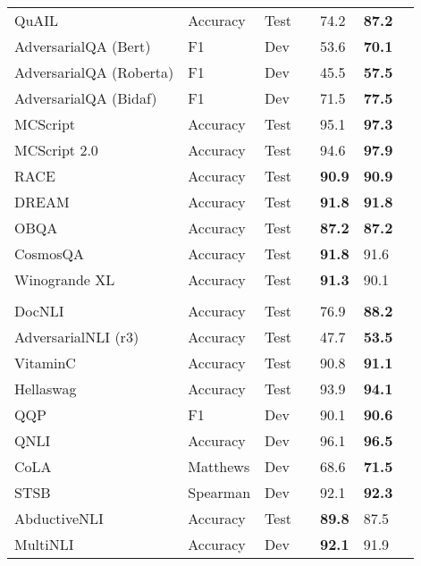 \documentclass[10pt]{article}
\begin{document}
\begin{center}
\begin{longtable}{lllllll}
    QuAIL & Accuracy & Test & \citeauthor{khashabi2022unifiedqa} & 74.2 & \textbf{87.2}\\ 
    AdversarialQA (Bert) & F1 & Dev &  \citeauthor{khashabi2022unifiedqa} & 53.6 & \textbf{70.1}\\
    AdversarialQA (Roberta) & F1 & Dev & \citeauthor{khashabi2022unifiedqa} & 45.5 & \textbf{57.5} \\
    AdversarialQA (Bidaf) & F1 & Dev & \citeauthor{khashabi2020unifiedqa} & 71.5 & \textbf{77.5}\\
    MCScript & Accuracy & Test & \citeauthor{khashabi2022unifiedqa} & 95.1 & \textbf{97.3} \\
    MCScript 2.0 & Accuracy & Test & \citeauthor{khashabi2022unifiedqa} & 94.6 & \textbf{97.9} \\ 
       RACE & Accuracy & Test &    \citeauthor{shoeybi2019megatron}  &\textbf{90.9}  & \textbf{90.9} \\ 
        DREAM & Accuracy & Test & \citeauthor{wan2020multi} & \textbf{91.8} & \textbf{91.8 }\\
          OBQA & Accuracy & Test & \citeauthor{khashabi2020unifiedqa}  & \textbf{87.2} & \textbf{87.2}\\
         CosmosQA & Accuracy & Test & \citeauthor{lourie2021unicorn}  &\textbf{91.8} & 91.6  \\
         Winogrande XL & Accuracy & Test & \citeauthor{lourie2021unicorn} & \textbf{91.3} & 90.1\\
    \\
        DocNLI & Accuracy & Test &\citeauthor{qin2022nlp} & 76.9 & \textbf{88.2} \\
    AdversarialNLI (r3) & Accuracy & Test & \citeauthor{wang2020infobert}  & 47.7 & \textbf{53.5}  \\
    VitaminC & Accuracy & Test & \citeauthor{schuster2021get}  & 90.8 & \textbf{91.1} \\ 
    Hellaswag & Accuracy & Test & \citeauthor{lourie2021unicorn} &  93.9 & \textbf{94.1} \\
     QQP & F1 & Dev & \citeauthor{raffel2019exploring} & 90.1 & \textbf{90.6}\\
     QNLI & Accuracy & Dev & \citeauthor{raffel2019exploring} & 96.1 & \textbf{96.5} \\ 
     CoLA & Matthews & Dev & \citeauthor{raffel2019exploring} & 68.6 & \textbf{71.5} \\
     STSB & Spearman & Dev & \citeauthor{raffel2019exploring} & 92.1 & \textbf{92.3} \\ 
       AbductiveNLI & Accuracy & Test & \citeauthor{he2020deberta} &  \textbf{89.8} & 87.5 \\
       MultiNLI & Accuracy & Dev & \citeauthor{raffel2019exploring} & \textbf{92.1} & 91.9\\ 
      

\end{longtable}
\end{center}
\end{document}
